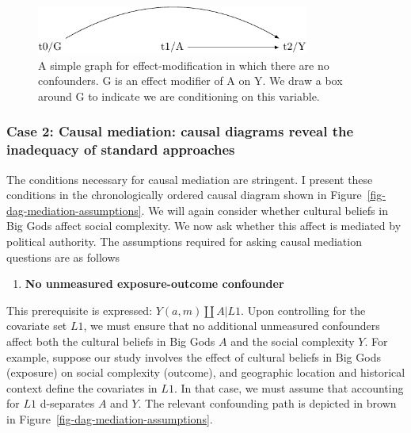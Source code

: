\documentclass[
  singlecolumn,
  9pt]{article}
\providecommand{\tightlist}{%
  \setlength{\itemsep}{0pt}\setlength{\parskip}{0pt}}\usepackage{longtable,booktabs,array}
\begin{document}
\begin{figure}

{\centering \includegraphics[width=0.8\textwidth,height=\textheight]{causal-dags_files/figure-pdf/fig-dag-effect-modfication-1.pdf}

}

\caption{\label{fig-dag-effect-modfication}A simple graph for
effect-modification in which there are no confounders. G is an effect
modifier of A on Y. We draw a box around G to indicate we are
conditioning on this variable.}

\end{figure}

\subsubsection{Case 2: Causal mediation: causal diagrams reveal the
inadequacy of standard
approaches}\label{case-2-causal-mediation-causal-diagrams-reveal-the-inadequacy-of-standard-approaches}

The conditions necessary for causal mediation are stringent. I present
these conditions in the chronologically ordered causal diagram shown in
Figure~\ref{fig-dag-mediation-assumptions}. We will again consider
whether cultural beliefs in Big Gods affect social complexity. We now
ask whether this affect is mediated by political authority. The
assumptions required for asking causal mediation questions are as
follows

\begin{enumerate}
\def\labelenumi{\arabic{enumi}.}
\tightlist
\item
  \textbf{No unmeasured exposure-outcome confounder}
\end{enumerate}

This prerequisite is expressed: \(Y(a,m) \coprod A | L1\). Upon
controlling for the covariate set \(L1\), we must ensure that no
additional unmeasured confounders affect both the cultural beliefs in
Big Gods \(A\) and the social complexity \(Y\). For example, suppose our
study involves the effect of cultural beliefs in Big Gods (exposure) on
social complexity (outcome), and geographic location and historical
context define the covariates in \(L1\). In that case, we must assume
that accounting for \(L1\) d-separates \(A\) and \(Y\). The relevant
confounding path is depicted in brown in
Figure~\ref{fig-dag-mediation-assumptions}.
\end{document}
